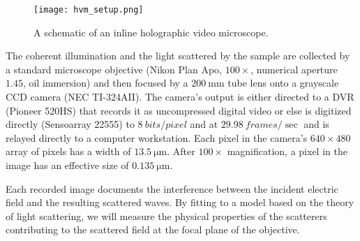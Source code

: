 \begin{figure}
  \centering
  \texttt{[image: hvm\_setup.png]}
  \caption{A schematic of an inline holographic video microscope.}
  \label{fig:hvm_setup}
\end{figure}


The coherent illumination and the light scattered by the sample are collected by a
standard microscope objective (Nikon Plan Apo, $\num{100}\times$,
numerical aperture $\num{1.45}$, oil immersion) and then focused
by a $\SI{200}{\mm}$ tube lens onto a grayscale CCD camera
(NEC TI-324AII).
The camera's output is either directed to a DVR (Pioneer 520HS) that records
it as uncompressed digital video or else is digitized directly (Sensoarray 22555)
to $\SI{8}{bits\per pixel}$ and at $\SI{29.98}{frames\per\sec}$ and is relayed
directly to a computer workstation.
Each pixel in the camera's $\si{640\times 480}$ array of pixels has a width of
$\SI{13.5}{\um}$. After $100\times$ magnification, a pixel in the
image has an effective size of $\SI{0.135}{\um}$.

Each recorded image documents the interference between the incident
electric field and the resulting scattered waves. By fitting
to a model based on the theory of light scattering, we will measure the physical
properties of the scatterers contributing to the scattered field
at the focal plane of the objective.





